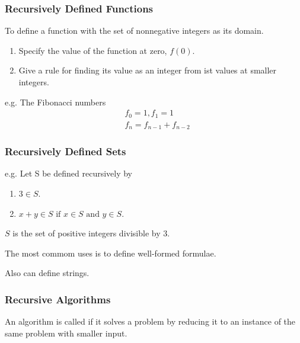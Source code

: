 \subsubsection{Recursively Defined Functions}
To define a function with the set of nonnegative integers as its domain. 
\begin{enumerate}
    \item Specify the value of the function at zero, $f(0)$.
    \item Give a rule for finding its value as an integer from ist values at smaller integers. 
\end{enumerate}

e.g. The Fibonacci numbers\begin{align*}
    &f_0=1, f_1=1\\
    &f_n=f_{n-1}+f_{n-2}
\end{align*}

\subsubsection{Recursively Defined Sets}
e.g. Let S be defined recursively by 
\begin{enumerate}
    \item $3 \in S$.
    \item $x+y\in S \text{ if } x\in S \text{ and }y \in S$.
\end{enumerate}

$S$ is the set of positive integers divisible by 3. 

The most commom uses is to define well-formed formulae. 

Also can define strings.

\subsubsection{Recursive Algorithms}
An algorithm is called  if it solves a problem by reducing it to an instance of the same problem with smaller input. 
